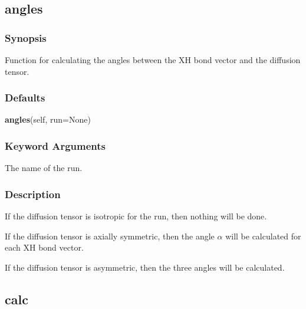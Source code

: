  

 \newpage 

 \subsection{angles} 

  
 \subsubsection{Synopsis} 

 Function for calculating the angles between the XH bond vector and the diffusion tensor. 
  

  
 \subsubsection{Defaults} 

 \textsf{\textbf{angles}(self, run=None)} 

  
 \subsubsection{Keyword Arguments} 

   The name of the run.  

  

  
 \subsubsection{Description} 

 If the diffusion tensor is isotropic for the run, then nothing will be done. 
  

 If the diffusion tensor is axially symmetric, then the angle $\alpha$ will be calculated for each XH bond vector. 
  

 If the diffusion tensor is asymmetric, then the three angles will be calculated. 
  

  

 \newpage 

 \subsection{calc} 

